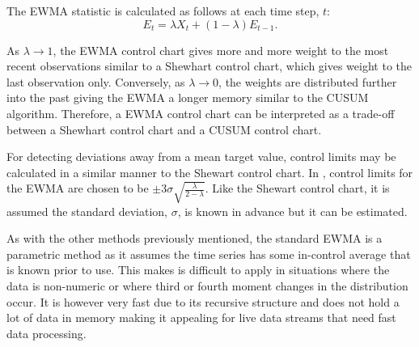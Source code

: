 The EWMA statistic is calculated as follows at each time step, $t$:
$$E_t = \lambda X_t + (1-\lambda)E_{t-1}. $$

As $\lambda \to 1$, the EWMA control chart gives more and more weight to the most recent observations similar to a Shewhart control chart, which gives weight to the last observation only. Conversely, as $\lambda \to 0$, the weights are distributed further into the past giving the EWMA a longer memory similar to the CUSUM algorithm. Therefore, a EWMA control chart can be interpreted as a trade-off between a Shewhart control chart and a CUSUM control chart. 

For detecting deviations away from a mean target value, control limits may be calculated in a similar manner to the Shewart control chart. In \cite{hunter1986exponentially}, control limits for the EWMA are chosen to be  $\pm 3 \sigma \sqrt{\frac{\lambda}{2-\lambda}}$.  Like the Shewart control chart, it is assumed the standard deviation, $\sigma$, is known in advance but it can be estimated. %


As with the other methods previously mentioned, the standard EWMA is a parametric method as it assumes the time series has some in-control average that is known prior to use. This makes is difficult to apply in situations where the data is non-numeric or where third or fourth moment changes in the distribution occur. It is however very fast due to its recursive structure and does not hold a lot of data in memory making it appealing for live data streams that need fast data processing.
